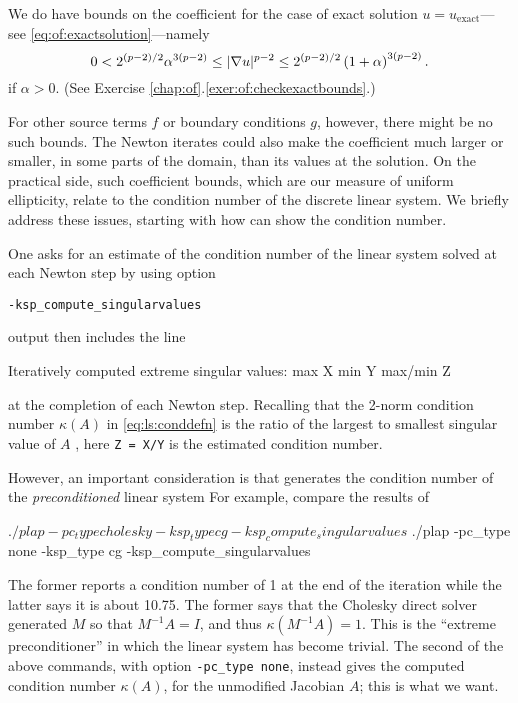 We do have bounds on the coefficient for the case of exact solution $u=u_{\text{exact}}$---see \eqref{eq:of:exactsolution}---namely
\begin{equation}
0 < 2^{(p-2)/2} \alpha^{3(p-2)} \le |\nabla u|^{p-2} \le 2^{(p-2)/2} \left(1+\alpha\right)^{3(p-2)}.  \label{eq:of:coeffbounds}
\end{equation}
if $\alpha > 0$.  (See Exercise \ref{chap:of}.\ref{exer:of:checkexactbounds}.)

For other source terms $f$ or boundary conditions $g$, however, there might be no such bounds.  The Newton iterates could also make the coefficient much larger or smaller, in some parts of the domain, than its values at the solution.  On the practical side, such coefficient bounds, which are our measure of uniform ellipticity, relate to the condition number of the discrete linear system.  We briefly address these issues, starting with how \PETSc can show the condition number.

One asks for an estimate of the condition number of the linear system solved at each Newton step by using option

\centerline{\texttt{-ksp\_compute\_singularvalues}}

\noindent \PETSc output then includes the line
\begin{code}
Iteratively computed extreme singular values: max X min Y max/min Z
\end{code}
at the completion of each Newton step.  Recalling that the 2-norm condition number $\kappa(A)$ in \eqref{eq:ls:conddefn} is the ratio of the largest to smallest singular value of $A$ \citep{TrefethenBau1997}, here \texttt{Z = X/Y} is the estimated condition number.

However, an important consideration is that \PETSc generates the condition number of the \emph{preconditioned} linear system  For example, compare the results of
\begin{cline}
$ ./plap -pc_type cholesky -ksp_type cg -ksp_compute_singularvalues
$ ./plap -pc_type none -ksp_type cg -ksp_compute_singularvalues
\end{cline}
The former reports a condition number of 1 at the end of the iteration while the latter says it is about 10.75.  The former says that the Cholesky direct solver generated $M$ so that $M^{-1} A=I$, and thus $\kappa(M^{-1} A)=1$.  This is the ``extreme preconditioner'' in which the linear system has become trivial.  The second of the above commands, with option \texttt{-pc\_type none}, instead gives the computed condition number $\kappa(A)$, for the unmodified Jacobian $A$; this is what we want.

